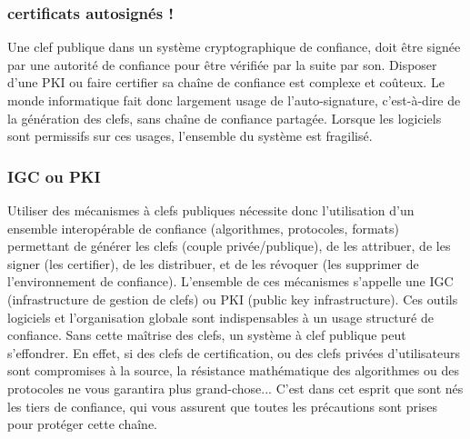 




\subsubsection{ certificats autosignés !}
Une clef publique dans un système cryptographique de confiance, doit être signée par une autorité de confiance pour être vérifiée par la suite par son. Disposer d'une PKI ou faire certifier sa chaîne de confiance est complexe et coûteux. Le monde informatique fait donc largement usage de l'auto-signature, c'est-à-dire de la génération des clefs, sans chaîne de confiance partagée. Lorsque les logiciels sont permissifs sur ces usages, l'ensemble du système est fragilisé.

\subsubsection{IGC ou PKI}

Utiliser des mécanismes à clefs publiques nécessite donc l'utilisation d'un ensemble interopérable de confiance (algorithmes, protocoles, formats) permettant de générer les clefs (couple privée/publique), de les attribuer, de les signer (les certifier), de les distribuer, et de les révoquer (les supprimer de l'environnement de confiance). L'ensemble de ces mécanismes s'appelle une IGC (infrastructure de gestion de clefs) ou PKI (public key infrastructure). Ces outils logiciels et l'organisation globale sont indispensables à un usage structuré de confiance. Sans cette maîtrise des clefs, un système à clef publique peut s'effondrer. En effet, si des clefs de certification, ou des clefs privées d'utilisateurs sont compromises à la source, la résistance mathématique des algorithmes ou des protocoles ne vous garantira plus grand-chose... C'est dans cet esprit que sont nés les tiers de confiance, qui vous assurent que toutes les précautions sont prises pour protéger cette chaîne.



